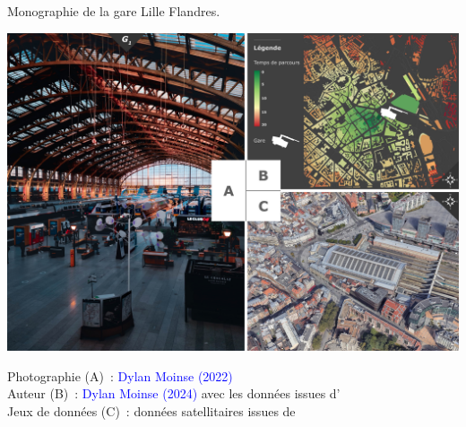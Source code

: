 \begin{refsegment}
        \begin{carte}[h!]\vspace*{4pt}
        \caption{Monographie de la gare Lille Flandres.}
        \label{fig-chap3:monographie-lille-flandres}
        \centerline{\includegraphics[height=.35\pageheight]{src/Figures/Chap-3/FR_Gare_Lille_Flandres}}
        \vspace{5pt}
        \begin{flushright}\scriptsize{
        Photographie (A)~: \textcolor{blue}{Dylan Moinse (2022)}
        \\
        Auteur (B)~: \textcolor{blue}{Dylan Moinse (2024)} avec les données issues d'\textcolor{blue}{\textcite{openstreetmap_openstreetmap_2023}}
        \\
      Jeux de données (C)~: données satellitaires issues de \textcolor{blue}{\textcite{google_earth_google_2023}}
      }\end{flushright}
      \end{carte}


\end{refsegment}
